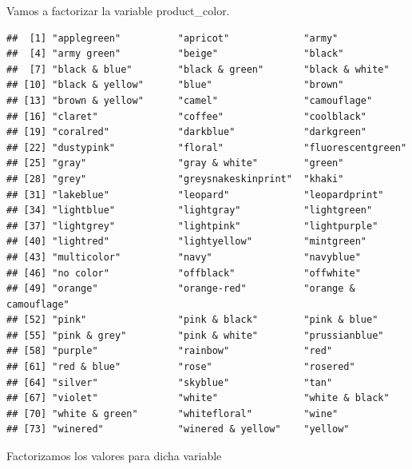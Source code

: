 \documentclass[
]{article}
\newenvironment{Shaded}{\begin{snugshade}}{\end{snugshade}}
\newcommand{\CommentTok}[1]{\textcolor[rgb]{0.56,0.35,0.01}{\textit{#1}}}
\newcommand{\KeywordTok}[1]{\textcolor[rgb]{0.13,0.29,0.53}{\textbf{#1}}}
\newcommand{\NormalTok}[1]{#1}
\newcommand{\OperatorTok}[1]{\textcolor[rgb]{0.81,0.36,0.00}{\textbf{#1}}}
\begin{document}
Vamos a factorizar la variable product\_color.

\begin{Shaded}
\end{Shaded}

\begin{verbatim}
##  [1] "applegreen"          "apricot"             "army"               
##  [4] "army green"          "beige"               "black"              
##  [7] "black & blue"        "black & green"       "black & white"      
## [10] "black & yellow"      "blue"                "brown"              
## [13] "brown & yellow"      "camel"               "camouflage"         
## [16] "claret"              "coffee"              "coolblack"          
## [19] "coralred"            "darkblue"            "darkgreen"          
## [22] "dustypink"           "floral"              "fluorescentgreen"   
## [25] "gray"                "gray & white"        "green"              
## [28] "grey"                "greysnakeskinprint"  "khaki"              
## [31] "lakeblue"            "leopard"             "leopardprint"       
## [34] "lightblue"           "lightgray"           "lightgreen"         
## [37] "lightgrey"           "lightpink"           "lightpurple"        
## [40] "lightred"            "lightyellow"         "mintgreen"          
## [43] "multicolor"          "navy"                "navyblue"           
## [46] "no color"            "offblack"            "offwhite"           
## [49] "orange"              "orange-red"          "orange & camouflage"
## [52] "pink"                "pink & black"        "pink & blue"        
## [55] "pink & grey"         "pink & white"        "prussianblue"       
## [58] "purple"              "rainbow"             "red"                
## [61] "red & blue"          "rose"                "rosered"            
## [64] "silver"              "skyblue"             "tan"                
## [67] "violet"              "white"               "white & black"      
## [70] "white & green"       "whitefloral"         "wine"               
## [73] "winered"             "winered & yellow"    "yellow"
\end{verbatim}

Factorizamos los valores para dicha variable
\end{document}
